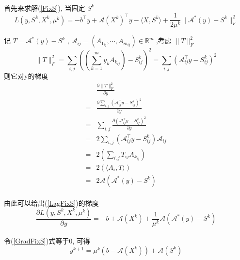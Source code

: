 \documentclass[UTF8]{ctexart}
\begin{document}
			\paragraph{}
				\quad 首先来求解(\ref{FixS}), 当固定 $S^k$
				\begin{equation}\label{LagFixS}
						L(y, S^k, X^k, \mu^k)
					=	-b^\top y + \mathcal{A}(X^k)^\top y - \langle{X, S^k}\rangle+ \frac{1}{2\mu^k} \lVert{\mathcal{A}^*(y) - S^k}\rVert^2_F
				\end{equation}

				记 $T = \mathcal{A}^*(y) - S^k$ , $\mathcal{A}_{ij} = (A_{1_{ij}}, \cdots, A_{m_{ij}}) \in \mathbb{R}^{m}$ ,考虑 $\lVert{T}\rVert^2_F$
				\[
						\lVert{T}\rVert^2_F
					=	\sum_{i, j}((\sum^m_{k = 1} y_k A_{k_{ij}}) - S^k_{ij})^2
					=	\sum_{i, j}(\mathcal{A}_{ij}^\top y - S^k_{ij})^2
				\]
				则它对y的梯度
				\begin{equation}
					\begin{aligned}
							& \frac{\partial \lVert{T}\rVert^2_F}{\partial y}\\
						=	& \frac{\partial \sum_{i, j}(\mathcal{A}_{ij}^\top y - S^k_{ij})^2}{\partial y}\\
						=	& \sum_{i, j}\frac{\partial (\mathcal{A}_{ij}^\top y - S^k_{ij})^2}{\partial y} \\
						=	& 2\sum_{i, j}(\mathcal{A}_{ij}^\top y - S^k_{ij}) \mathcal{A}_{ij}\\
						=	& 2(\sum_{i, j}T_{ij} A_{k_{ij}})\\
						=	& 2(\langle{A_i, T}\rangle)\\
						=	& 2\mathcal{A}(\mathcal{A}^*(y) - S^k)
					\end{aligned}
				\end{equation}

			\paragraph{}
				\quad 由此可以给出(\ref{LagFixS})的梯度
				\begin{equation}\label{GradFixS}
						\frac{\partial L(y, S^k, X^k, \mu^k)}{\partial y}
					=	-b + \mathcal{A}(X^k) + \frac{1}{\mu^k} \mathcal{A}(\mathcal{A}^*(y) - S^k)
				\end{equation}

			\paragraph{}
				\quad 令(\ref{GradFixS})式等于0, 可得
				\begin{equation}\label{dualAY}
					y^{k + 1} = \mu^k(b - \mathcal{A}(X^k)) + \mathcal{A}(S^k)
				\end{equation}
\end{document}
